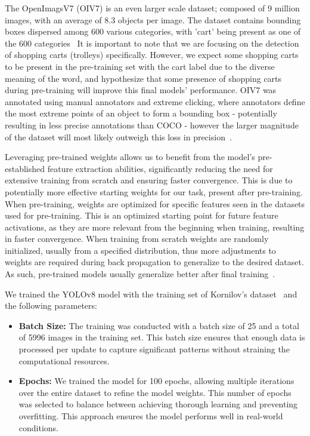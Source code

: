 \documentclass[10pt,twocolumn,letterpaper]{article}
\begin{document}
The OpenImagsV7 (OIV7) is an even larger scale dataset; composed of 9 million images, with an average of 8.3 objects per image. The dataset contains bounding boxes dispersed among 600 various categories, with 'cart' being present as one of the 600 categories~\cite{openimagesv7} It is important to note that we are focusing on the detection of shopping carts (trolleys) specifically. However, we expect some shopping carts to be present in the pre-training set with the cart label due to the diverse meaning of the word, and hypothesize that some presence of shopping carts during pre-training will improve this final models' performance. OIV7 was annotated using manual annotators and extreme clicking, where annotators define the most extreme points of an object to form a bounding box - potentially resulting in less precise annotations than COCO - however the larger magnitude of the dataset will most likely outweigh this loss in precision~\cite{openimagesv4}.

Leveraging pre-trained weights allows us to benefit from the model's pre-established feature extraction abilities, significantly reducing the need for extensive training from scratch and ensuring faster convergence. This is due to potentially more effective starting weights for our task, present after pre-training. When pre-training, weights are optimized for specific features seen in the datasets used for pre-training. This is an optimized starting point for future feature activations, as they are more relevant from the beginning when training, resulting in faster convergence. When training from scratch weights are randomly initialized, usually from a specified distribution, thus more adjustments to weights are required during back propagation to generalize to the desired dataset. As such, pre-trained models usually generalize better after final training~\cite{why_does}.

We trained the YOLOv8 model with the training set of Kornilov's dataset~\cite{kornilov-dataset} and the following parameters:

\begin{itemize}
    \item{\textbf{Batch Size:}}
    The training was conducted with a batch size of 25 and a total of 5996 images in the training set. This batch size ensures that enough data is processed per update to capture significant patterns without straining the computational resources.
    \item{\textbf{Epochs:}}
    We trained the model for 100 epochs, allowing multiple iterations over the entire dataset to refine the model weights. This number of epochs was selected to balance between achieving thorough learning and preventing overfitting. This approach ensures the model performs well in real-world conditions.
\end{itemize}
\end{document}
